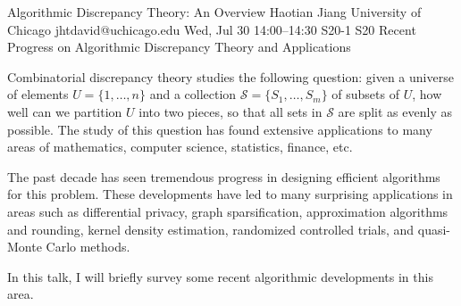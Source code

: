 \begin{talk}
  {Algorithmic Discrepancy Theory: An Overview}%
  {Haotian Jiang}%
  {University of Chicago}%
  {jhtdavid@uchicago.edu}%
  {}%
  {}%
  {Wed, Jul 30 14:00–14:30}%
  {S20-1}%
  {S20}%
  {}
  {Recent Progress on Algorithmic Discrepancy Theory and Applications}
				
			
Combinatorial discrepancy theory studies the following question: given a universe of elements $U=\{1,\ldots, n\}$ and a collection $\mathcal{S} = \{S_1, \ldots, S_m\}$ of subsets of $U$, how well can we partition $U$ into two pieces, so that all sets in $\mathcal{S}$ are split as evenly as possible.
The study of this question has found extensive applications to many areas of mathematics, computer science, statistics, finance, etc. 

The past decade has seen tremendous progress in designing efficient algorithms for this problem. These developments have led to many surprising applications in areas such as differential privacy, graph sparsification, approximation algorithms and rounding, kernel density estimation, randomized controlled trials, and quasi-Monte Carlo methods.

In this talk, I will briefly survey some recent algorithmic developments in this area. 



\end{talk}

